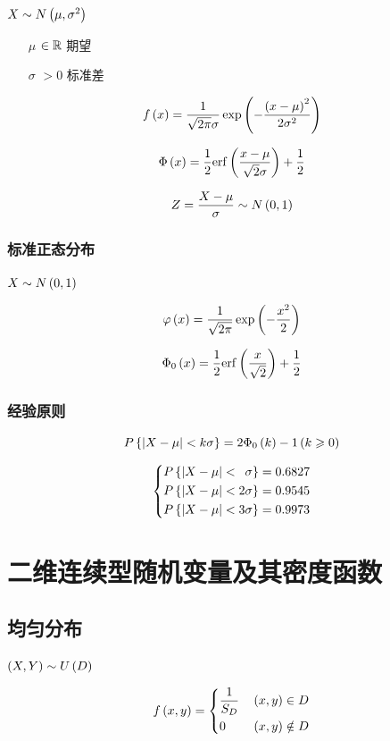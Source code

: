 \documentclass{article}
\begin{document}
$X\sim N\left(\mu,\sigma^2\right)$

\begin{enumerate}
    \item [$\mu$] $\in\mathbb R$ 期望
    \item [$\sigma$] $>0$ 标准差
\end{enumerate}

\[f\left(x\right)=\frac1{\sqrt{2\pi}\sigma}\exp\left(-\frac{{\left(x-\mu\right)}^2}{2\sigma^2}\right)\]

\[\Phi\left(x\right)=\frac12\mathrm{erf}\left(\frac{x-\mu}{\sqrt2\sigma}\right)+\frac12\]

\[Z=\frac{X-\mu}\sigma\sim N\left(0,1\right)\]

\subsubsection{标准正态分布}

$X\sim N\left(0,1\right)$

\[\varphi\left(x\right)=\frac1{\sqrt{2\pi}}\exp\left(-\frac{x^2}2\right)\]

\[\Phi_0\left(x\right)=\frac12\mathrm{erf}\left(\frac x{\sqrt2}\right)+\frac12\]

\subsubsection{经验原则}

\[P\left\{\left|X-\mu\right|<k\sigma\right\}=2\Phi_0\left(k\right)-1\left(k\geqslant0\right)\]

\[\left\{\begin{aligned}
        P\left\{\left|X-\mu\right|<\enspace\sigma\right\}=0.6827 \\
        P\left\{\left|X-\mu\right|<2\sigma\right\}=0.9545        \\
        P\left\{\left|X-\mu\right|<3\sigma\right\}=0.9973
    \end{aligned}\right.\]

\section{二维连续型随机变量及其密度函数}

\subsection{均匀分布}

$\left(X,Y\right)\sim U\left(D\right)$

\[f\left(x,y\right)=\left\{\begin{aligned}
         & \frac1{S_D} &  & \left(x,y\right)\in D    \\
         & 0           &  & \left(x,y\right)\notin D \\
    \end{aligned}\right.\]
\end{document}
